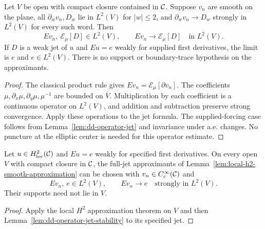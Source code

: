 \begin{lemma}
\label{lem:dd-operator-jet-stability}
\leanok
Let $V$ be open with compact closure contained in $\mathcal{C}$.
Suppose $v_n$ are smooth on the plane, all $\partial_wv_n,D_w$ lie in
$L^2(V)$ for $|w|\le2$, and
$\partial_wv_n\to D_w$ strongly in $L^2(V)$ for every such word. Then
\[
 Ev_n,\ \mathcal E_\mu[D]\in L^2(V),\qquad
 Ev_n\longrightarrow\mathcal E_\mu[D]\quad\text{in }L^2(V).
\]
If $D$ is a weak jet of $u$ and $Eu=e$ weakly for supplied first derivatives,
the limit is $e$ and $e\in L^2(V)$.
There is no support or boundary-trace hypothesis on the approximants.
\end{lemma}

\begin{proof}
\leanok
The classical product rule gives $Ev_n=\mathcal E_\mu[\partial v_n]$.
The coefficients $\mu,\partial_x\mu,\partial_y\mu,\mu^{-1}$ are bounded
on $\overline V$. Multiplication by each coefficient is a continuous
operator on $L^2(V)$, and addition and subtraction preserve strong convergence.
Apply these operations to the jet formula. The supplied-forcing case follows
from Lemma~\ref{lem:dd-operator-jet} and invariance under a.e. changes.
No puncture at the elliptic center is needed for this operator estimate.
\end{proof}

\begin{corollary}
\label{cor:dd-operator-smooth-approximation}
\leanok
Let $u\in H^2_{\mathrm{loc}}(\mathcal{C})$ and $Eu=e$ weakly for specified first
derivatives. On every open $V$ with compact closure in $\mathcal{C}$,
the full-jet approximants of Lemma~\ref{lem:local-h2-smooth-approximation}
can be chosen with $v_n\in C_c^\infty(\mathcal{C})$ and
\[
 Ev_n,\ e\in L^2(V),\qquad Ev_n\longrightarrow e
 \quad\text{strongly in }L^2(V).
\]
Their supports need not lie in $V$.
\end{corollary}

\begin{proof}
\leanok
Apply the local $H^2$ approximation theorem on $V$ and then
Lemma~\ref{lem:dd-operator-jet-stability} to its specified jet.
\end{proof}

